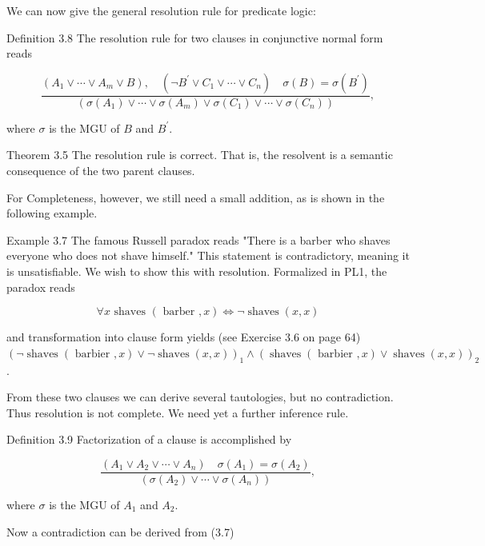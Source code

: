 \documentclass[10pt]{article}
\begin{document}
We can now give the general resolution rule for predicate logic:

Definition 3.8 The resolution rule for two clauses in conjunctive normal form reads


\begin{equation*}
\frac{\left(A_{1} \vee \cdots \vee A_{m} \vee B\right), \quad\left(\neg B^{\prime} \vee C_{1} \vee \cdots \vee C_{n}\right) \quad \sigma(B)=\sigma\left(B^{\prime}\right)}{\left(\sigma\left(A_{1}\right) \vee \cdots \vee \sigma\left(A_{m}\right) \vee \sigma\left(C_{1}\right) \vee \cdots \vee \sigma\left(C_{n}\right)\right)}, \tag{3.6}
\end{equation*}


where $\sigma$ is the MGU of $B$ and $B^{\prime}$.

Theorem 3.5 The resolution rule is correct. That is, the resolvent is a semantic consequence of the two parent clauses.

For Completeness, however, we still need a small addition, as is shown in the following example.

Example 3.7 The famous Russell paradox reads "There is a barber who shaves everyone who does not shave himself." This statement is contradictory, meaning it is unsatisfiable. We wish to show this with resolution. Formalized in PL1, the paradox reads

$$
\forall x \text { shaves }(\text { barber }, x) \Leftrightarrow \neg \operatorname{shaves}(x, x)
$$

and transformation into clause form yields (see Exercise 3.6 on page 64)\\
$(\neg \operatorname{shaves}(\text { barbier }, x) \vee \neg \operatorname{shaves}(x, x))_{1} \wedge(\operatorname{shaves}(\text { barbier }, x) \vee \operatorname{shaves}(x, x))_{2}$.

From these two clauses we can derive several tautologies, but no contradiction. Thus resolution is not complete. We need yet a further inference rule.

Definition 3.9 Factorization of a clause is accomplished by

$$
\frac{\left(A_{1} \vee A_{2} \vee \cdots \vee A_{n}\right) \quad \sigma\left(A_{1}\right)=\sigma\left(A_{2}\right)}{\left(\sigma\left(A_{2}\right) \vee \cdots \vee \sigma\left(A_{n}\right)\right)},
$$

where $\sigma$ is the MGU of $A_{1}$ and $A_{2}$.

Now a contradiction can be derived from (3.7)
\end{document}
